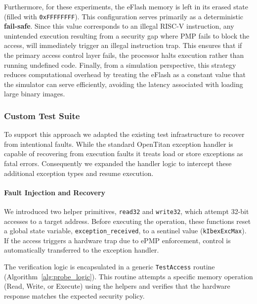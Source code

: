\documentclass[10pt,a4paper,twocolumn,twoside]{article}
\begin{document}
Furthermore, for these experiments, the eFlash memory is left in its erased state (filled with \texttt{0xFFFFFFFF}). This configuration serves primarily as a deterministic \textbf{fail-safe}. Since this value corresponds to an illegal RISC-V instruction, any unintended execution resulting from a security gap where PMP fails to block the access, will immediately trigger an illegal instruction trap. This ensures that if the primary access control layer fails, the processor halts execution rather than running undefined code. Finally, from a simulation perspective, this strategy reduces computational overhead by treating the eFlash as a constant value that the simulator can serve efficiently, avoiding the latency associated with loading large binary images.

\subsubsection{Custom Test Suite}

To support this approach we adapted the existing test infrastructure to recover from intentional faults. While the standard OpenTitan exception handler is capable of recovering from execution faults it treats load or store exceptions as fatal errors. Consequently we expanded the handler logic to intercept these additional exception types and resume execution.

\paragraph{Fault Injection and Recovery}
We introduced two helper primitives, \texttt{read32} and \texttt{write32}, which attempt 32-bit accesses to a target address. Before executing the operation, these functions reset a global state variable, \texttt{exception\_received}, to a sentinel value (\texttt{kIbexExcMax}). If the access triggers a hardware trap due to ePMP enforcement, control is automatically transferred to the exception handler.

The verification logic is encapsulated in a generic \texttt{TestAccess} routine (Algorithm~\ref{alg:probe_logic}). This routine attempts a specific memory operation (Read, Write, or Execute) using the helpers and verifies that the hardware response matches the expected security policy.
\end{document}
